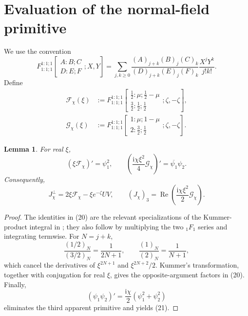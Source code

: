 \documentclass[11pt]{article}
\newtheorem{lemma}{Lemma}
\newcommand{\ii}{\mathrm i}
\newcommand{\Rea}{\operatorname{Re}}
\begin{document}
\section{Evaluation of the normal-field primitive}
We use the convention
\begin{equation}
F_{1:1;1}^{1:1;1}\!\left[
\begin{matrix}A:B;C\\D:E;F\end{matrix};X,Y\right]
=\sum_{j,k\ge0}\frac{(A)_{j+k}(B)_j(C)_k}{(D)_{j+k}(E)_j(F)_k}\frac{X^jY^k}{j!k!}. \tag{17}
\end{equation}
Define
\begin{align}
\mathcal F_\chi(\xi)
&:=F_{1:1;1}^{1:1;1}\!\left[
\begin{matrix}\frac12:\mu;\frac12-\mu\\[1mm]\frac32:\frac12;\frac12\end{matrix};\zeta,-\zeta\right], \tag{18}\\
\mathcal G_\chi(\xi)
&:=F_{1:1;1}^{1:1;1}\!\left[
\begin{matrix}1:\mu;1-\mu\\[1mm]2:\frac32;\frac12\end{matrix};\zeta,-\zeta\right]. \tag{19}
\end{align}
\begin{lemma}
For real \(\xi\),
\begin{equation}
 (\xi\mathcal F_\chi)'=\psi_1^2,\qquad
 \left(\frac{\ii\chi\xi^2}{4}\mathcal G_\chi\right)'=\overline{\psi_1}\psi_2. \tag{20}
\end{equation}
Consequently,
\begin{equation}
 J_\chi^\perp=2\xi\mathcal F_\chi-\xi e^{-\zeta}UV,
 \qquad
 (J_\chi)_3=\Rea\left(\frac{\ii\chi\xi^2}{2}\mathcal G_\chi\right). \tag{21}
\end{equation}
\end{lemma}
\begin{proof}
The identities in (20) are the relevant specializations of the Kummer-product integral in \cite{Jursenas2014}; they also follow by multiplying the two \({}_1F_1\) series and integrating termwise. For \(N=j+k\),
\[
 \frac{(1/2)_N}{(3/2)_N}=\frac1{2N+1},\qquad
 \frac{(1)_N}{(2)_N}=\frac1{N+1},
\]
which cancel the derivatives of \(\xi^{2N+1}\) and \(\xi^{2N+2}/2\). Kummer's transformation, together with conjugation for real \(\xi\), gives the opposite-argument factors in (20). Finally,
\[
 (\psi_1\psi_2)'=\frac{\ii\chi}{2}(\psi_1^2+\psi_2^2)
\]
eliminates the third apparent primitive and yields (21).
\end{proof}
\end{document}
